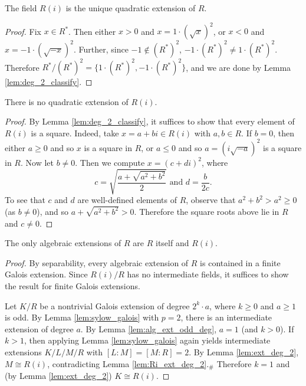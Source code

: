 \begin{lemma}
  \label{lem:ext_deg_2}
  The field $R(i)$ is the unique quadratic extension of $R$.
\end{lemma}
\begin{proof}
  Fix $x\in R^*$. Then either $x>0$ and $x=1\cdot(\sqrt{x})^2$, or $x<0$ and $x=-1\cdot(\sqrt{-x})^2$. Further, since $-1\notin(R^*)^2$, $-1\cdot(R^*)^2\neq 1\cdot(R^*)^2$. Therefore $R^*/{(R^*)^2}=\{1\cdot(R^*)^2,-1\cdot(R^*)^2\}$, and we are done by Lemma \ref{lem:deg_2_classify}.
\end{proof}

\begin{lemma}
  \label{lem:Ri_ext_deg_2}
  There is no quadratic extension of $R(i)$.
\end{lemma}
\begin{proof}
  By Lemma \ref{lem:deg_2_classify}, it suffices to show that every element of $R(i)$ is a square. Indeed, take $x=a+bi\in R(i)$ with $a,b\in R$. If $b=0$, then either $a\geq0$ and so $x$ is a square in $R$, or $a\leq0$ and so $a=(i\sqrt{-a})^2$ is a square in $R$. Now let $b\neq0$. Then we compute $x=(c+di)^2$, where
  \[c=\sqrt{\frac{a+\sqrt{a^2+b^2}}{2}}\text{ and }d=\frac{b}{2c}.\]
  To see that $c$ and $d$ are well-defined elements of $R$, observe that $a^2+b^2>a^2\geq0$ (as $b\neq0$), and so $a+\sqrt{a^2+b^2}>0$. Therefore the square roots above lie in $R$ and $c\neq0$.
\end{proof}

\begin{theorem}
  \label{thm:FTAlg}
  The only algebraic extensions of $R$ are $R$ itself and $R(i)$.
\end{theorem}
\begin{proof}
  By separability, every algebraic extension of $R$ is contained in a finite Galois extension. Since $R(i)/R$ has no intermediate fields, it suffices to show the result for finite Galois extensions.
  
  Let $K/R$ be a nontrivial Galois extension of degree $2^k\cdot a$, where $k\geq 0$ and $a\geq1$ is odd. By Lemma \ref{lem:sylow_galois} with $p=2$, there is an intermediate extension of degree $a$. By Lemma \ref{lem:alg_ext_odd_deg}, $a=1$ (and $k>0$). If $k>1$, then applying Lemma \ref{lem:sylow_galois} again yields intermediate extensions $K/L/M/R$ with $[L:M]=[M:R]=2$. By Lemma \ref{lem:ext_deg_2}, $M\cong R(i)$, contradicting Lemma \ref{lem:Ri_ext_deg_2}.$_\#$ Therefore $k=1$ and (by Lemma \ref{lem:ext_deg_2}) $K\cong R(i)$.
\end{proof}

